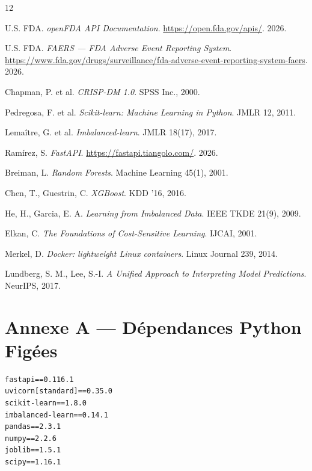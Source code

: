 \documentclass[11pt,a4paper,twoside,openright]{report}
\begin{document}
\begin{thebibliography}{12}

U.S. FDA. \textit{openFDA API Documentation}. \url{https://open.fda.gov/apis/}. 2026.

U.S. FDA. \textit{FAERS — FDA Adverse Event Reporting System}. \url{https://www.fda.gov/drugs/surveillance/fda-adverse-event-reporting-system-faers}. 2026.

Chapman, P. et al. \textit{CRISP-DM 1.0}. SPSS Inc., 2000.

Pedregosa, F. et al. \textit{Scikit-learn: Machine Learning in Python}. JMLR 12, 2011.

Lemaître, G. et al. \textit{Imbalanced-learn}. JMLR 18(17), 2017.

Ramírez, S. \textit{FastAPI}. \url{https://fastapi.tiangolo.com/}. 2026.

Breiman, L. \textit{Random Forests}. Machine Learning 45(1), 2001.

Chen, T., Guestrin, C. \textit{XGBoost}. KDD '16, 2016.

He, H., Garcia, E. A. \textit{Learning from Imbalanced Data}. IEEE TKDE 21(9), 2009.

Elkan, C. \textit{The Foundations of Cost-Sensitive Learning}. IJCAI, 2001.

Merkel, D. \textit{Docker: lightweight Linux containers}. Linux Journal 239, 2014.

Lundberg, S. M., Lee, S.-I. \textit{A Unified Approach to Interpreting Model Predictions}. NeurIPS, 2017.

\end{thebibliography}

\appendix

\chapter{Annexe A — Dépendances Python Figées}
\begin{lstlisting}
fastapi==0.116.1
uvicorn[standard]==0.35.0
scikit-learn==1.8.0
imbalanced-learn==0.14.1
pandas==2.3.1
numpy==2.2.6
joblib==1.5.1
scipy==1.16.1
\end{lstlisting}
\end{document}
